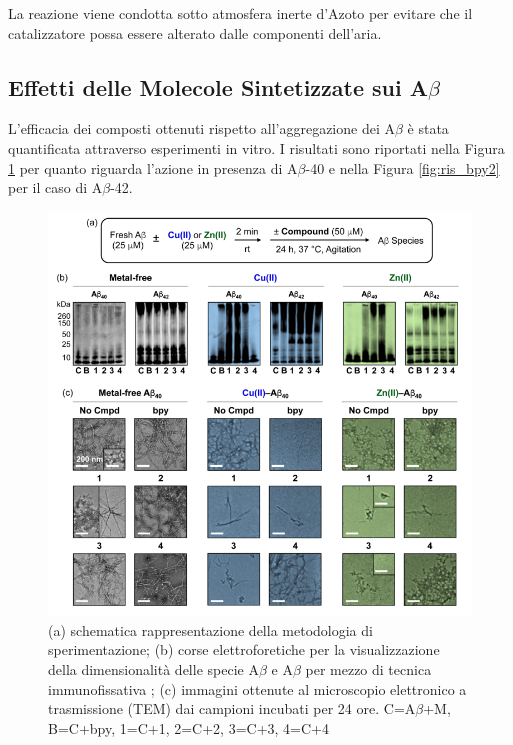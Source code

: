 \documentclass[a4paper, 12pt]{article}
\begin{document}
La reazione viene condotta sotto atmosfera inerte d'Azoto per evitare che il catalizzatore possa essere alterato dalle componenti dell'aria.

\subsection{Effetti delle Molecole Sintetizzate sui A$\beta$}
L'efficacia dei composti ottenuti rispetto all'aggregazione dei A$\beta$ è stata quantificata attraverso esperimenti in vitro. I risultati sono riportati nella Figura \ref{fig:ris_bpy} per quanto riguarda l'azione in presenza di A$\beta$-40 e nella Figura \ref{fig:ris_bpy2} per il caso di A$\beta$-42.

\begin{figure}[H]
	\centering
	\includegraphics[width=\linewidth]{immagini/ris_bpy.png}
	\caption{(a) schematica rappresentazione della metodologia di sperimentazione; (b) corse elettroforetiche per la visualizzazione della dimensionalità delle specie A$\beta$ e A$\beta$ per mezzo di tecnica immunofissativa \cite{kurien_western_2006}; (c) immagini ottenute al microscopio elettronico a trasmissione (TEM) dai campioni incubati per 24 ore. C=A$\beta$+M, B=C+bpy, 1=C+1, 2=C+2, 3=C+3, 4=C+4 }
	\label{fig:ris_bpy}
\end{figure}
\end{document}
